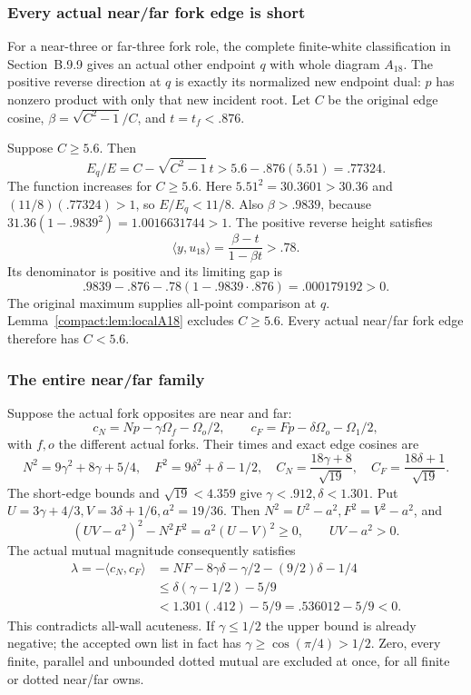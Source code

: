 \documentclass[11pt]{article}
\theoremstyle{remark}\newtheorem{remark}[theorem]{Remark}
\numberwithin{equation}{section}
\newcommand{\ip}[2]{\langle #1,#2\rangle}
\begin{document}
\subsubsection{Every actual near/far fork edge is short}
For a near-three or far-three fork role, the complete finite-white
classification in Section~B.9.9 gives an
actual other endpoint \(q\)
with whole diagram \(A_{18}\). The positive reverse direction
at \(q\) is exactly its normalized new endpoint dual: \(p\)
has nonzero product with only that new incident root.
Let \(C\) be the original edge cosine,
\(\beta=\sqrt{C^2-1}/C\), and \(t=t_f<.876\).

Suppose \(C\geq5.6\). Then
 \[
 E_q/E=C-\sqrt{C^2-1}\,t
       >5.6-.876(5.51)=.77324.
\]
The function increases for \(C\geq5.6\).
Here \(5.51^2=30.3601>30.36\) and
 \((11/8)(.77324)>1\), so \(E/E_q<11/8\).
Also \(\beta>.9839\), because
 \(31.36(1-.9839^2)=1.0016631744>1\).
The positive reverse height satisfies
 \[
 \ip{y}{u_{18}}=\frac{\beta-t}{1-\beta t}>.78.
\]
Its denominator is positive and its limiting gap is
 \[
 .9839-.876-.78(1-.9839\cdot.876)=.000179192>0.
\]
The original maximum supplies all-point comparison at \(q\).
Lemma~\ref{compact:lem:localA18} excludes \(C\geq5.6\).
Every actual near/far fork edge therefore has \(C<5.6\).

\subsubsection{The entire near/far family}
Suppose the actual fork opposites are near and far:
\[
 c_N=Np-\gamma\Omega_f-\Omega_o/2,\qquad
 c_F=Fp-\delta\Omega_o-\Omega_1/2,
\]
with \(f,o\) the different actual forks.
Their times and exact edge cosines are
 \[
 N^2=9\gamma^2+8\gamma+5/4,\quad
 F^2=9\delta^2+\delta-1/2,\quad
 C_N=\frac{18\gamma+8}{\sqrt{19}},\quad
 C_F=\frac{18\delta+1}{\sqrt{19}}.
\]
The short-edge bounds and \(\sqrt{19}<4.359\) give
 \(\gamma<.912,\delta<1.301\).
Put \(U=3\gamma+4/3,V=3\delta+1/6,a^2=19/36\).
Then \(N^2=U^2-a^2,F^2=V^2-a^2\), and
 \[
 (UV-a^2)^2-N^2F^2=a^2(U-V)^2\geq0,\qquad UV-a^2>0.
\]
The actual mutual magnitude consequently satisfies
 \begin{align*}
 \lambda=-\ip{c_N}{c_F}
 &=NF-8\gamma\delta-\gamma/2-(9/2)\delta-1/4\\
 &\leq\delta(\gamma-1/2)-5/9\\
 &<1.301(.412)-5/9=.536012-5/9<0.
\end{align*}
This contradicts all-wall acuteness. If \(\gamma\leq1/2\)
the upper bound is already negative; the accepted own list
in fact has \(\gamma\geq\cos(\pi/4)>1/2\).
Zero, every finite, parallel and unbounded dotted mutual
are excluded at once, for all finite or dotted near/far owns.
\end{document}
